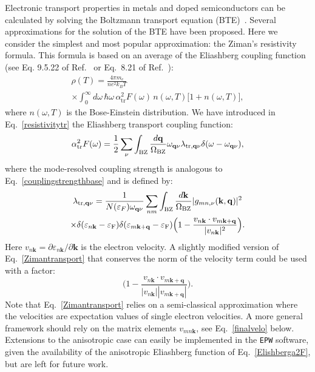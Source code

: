 \documentclass[final,3p,times,twocolumn]{elsarticle}
\begin{document}
Electronic transport properties in metals and doped semiconductors can be calculated by solving the Boltzmann transport equation (BTE)~\cite{Ziman1960}.
Several approximations for the solution of the BTE have been proposed. 
Here we consider the simplest and most popular approximation: the Ziman's resistivity formula. This formula is based on an average of the Eliashberg coupling function (see Eq. 9.5.22 of Ref.~\cite{Ziman1960} or Eq.~8.21 of Ref.~\cite{Grimvall1981}):
\begin{multline}\label{resistivitytr}
\rho(T) = \frac{4\pi m_e}{n e^2 k_B T}\\
\times \int_0^{\infty} \! d\omega\, \hbar \omega\, \alpha_{\text{tr}}^2 F(\omega)\, n(\omega,T)\big[1+n(\omega,T)\big],
\end{multline}
where $n(\omega,T)$ is the Bose-Einstein distribution. We have introduced in Eq.~\eqref{resistivitytr} the Eliashberg transport coupling function:
\begin{equation}\label{eliashtransport}
\alpha_{\text{tr}}^2 F(\omega) =  \frac{1}{2} \sum_{\nu}\int_{\rm BZ} \frac{d\mathbf{q}}{\Omega_{\rm BZ}} \omega_{\mathbf{q}\nu} \lambda_{\text{tr},\mathbf{q}\nu} \delta(\omega-\omega_{\mathbf{q}\nu}),
\end{equation} 
where the mode-resolved coupling strength is analogous to Eq.~\eqref{couplingstrengthbase} and is defined by: 
\begin{multline}\label{Zimantransport}
\lambda_{\text{tr},\mathbf{q}\nu} = \frac{1}{N(\varepsilon_F) \omega_{\mathbf{q}\nu}}  \sum_{nm}  \int_{\rm BZ} \frac{d\mathbf{k}}{\Omega_{\rm BZ}} |g_{mn,\nu}(\mathbf{k,q})|^2 \\
 \times \delta(\varepsilon_{n\mathbf{k}}-\varepsilon_{\rm F}) \delta(\varepsilon_{m\mathbf{k+q}}-\varepsilon_{\rm F})\Big( 1-\frac{v_{n\mathbf{k}}\cdot v_{m\mathbf{k+q}}}{|v_{n\mathbf{k}}|^2}\Big).
\end{multline}
Here $v_{n\mathbf{k}} = \partial \varepsilon_{n\mathbf{k}}/\partial \mathbf{k}$ is the electron velocity. A slightly modified version of Eq.~\eqref{Zimantransport} that conserves the norm of the velocity term could be used with a factor:
\begin{equation}
\Big( 1-\frac{v_{n\mathbf{k}}\cdot v_{m\mathbf{k+q}}}{|v_{n\mathbf{k}}||v_{m\mathbf{k+q}}|}\Big).
\end{equation}
 Note that Eq.~\eqref{Zimantransport} relies on a semi-classical approximation where the velocities are expectation values of single electron velocities. A more general framework should rely on the matrix elements $v_{mn\mathbf{k}}$, see Eq.~\eqref{finalvelo} below.
Extensions to the anisotropic case can easily be implemented in the \texttt{EPW} software, given the availability of the anisotropic Eliashberg function of Eq.~\eqref{Elishberga2F}, but are left for future work. 
\end{document}
